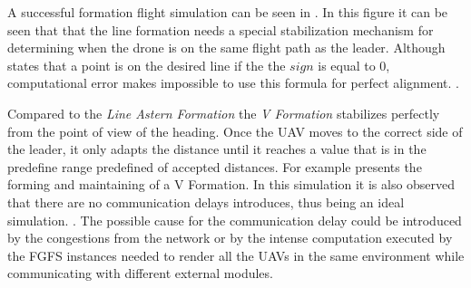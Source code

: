 A successful formation flight simulation can be seen in .
In this figure it can be seen that that the line formation needs a special stabilization
mechanism for determining when the drone is on the same flight path as the leader.
Although  states that a point
is on the desired line if the the $sign$ is equal to 0, computational error
makes impossible to use this formula for perfect alignment. 
. 

Compared to the \textit{Line Astern Formation} the \textit{V Formation} stabilizes 
perfectly from the point of view of the heading. Once the UAV moves to the 
correct side of the leader, it only adapts the distance until it reaches a value
that is in the predefine range predefined of accepted distances. For example
 presents the forming and maintaining of a V
Formation. In this simulation it is also observed that there are no communication
delays introduces, thus being an ideal simulation.
. 
\newpage
The possible cause for the communication delay could be introduced by the 
congestions from the network or by the intense computation executed by the FGFS
instances needed to render all the UAVs in the same environment while communicating
with different external modules.


